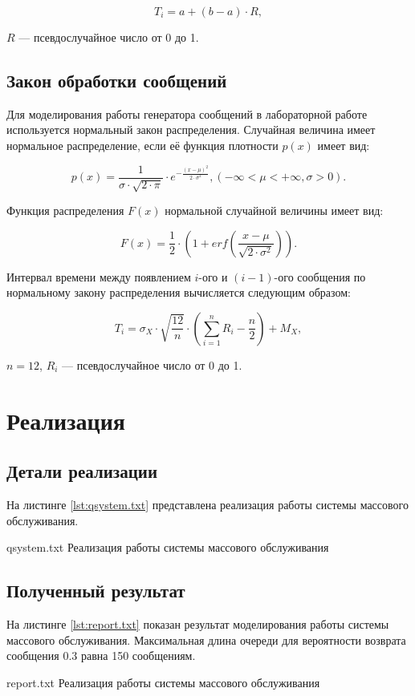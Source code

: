 \begin{equation}
	T_{i} = a + (b - a) \cdot R,
\end{equation}

 $R$ --- псевдослучайное число от 0 до 1.

\section{Закон обработки сообщений}

Для моделирования работы генератора сообщений в лабораторной работе используется нормальный закон распределения. Случайная величина имеет нормальное распределение, если её функция плотности $p(x)$ имеет вид:

\begin{equation}
    p(x) = \frac{1}{\sigma \cdot \sqrt{2 \cdot \pi}} \cdot e^{-\frac{(x - \mu)^2}{2 \cdot \sigma^2}}, (-\infty < \mu < +\infty, \sigma > 0).
\end{equation}

Функция распределения $F(x)$ нормальной случайной величины имеет вид:

\begin{equation}
    F(x) = \frac{1}{2} \cdot (1 + erf(\frac{x - \mu}{\sqrt{2 \cdot \sigma^2}})).
\end{equation}

Интервал времени между появлением $i$-ого и $(i - 1)$-ого сообщения по нормальному закону распределения вычисляется следующим образом:

\begin{equation}
	T_{i} = \sigma_{X} \cdot \sqrt{\frac{12}{n}} \cdot (\sum_{i = 1}^n R_{i} - \frac{n}{2}) + M_{X}, 
\end{equation}

 $n = 12$, $R_{i}$ --- псевдослучайное число от 0 до 1.

\chapter{Реализация}

\section{Детали реализации}

На листинге \ref{lst:qsystem.txt} представлена реализация работы системы массового обслуживания.

    {qsystem.txt}
    {Реализация работы системы массового обслуживания}
\newpage

\section{Полученный результат}

На листинге \ref{lst:report.txt} показан результат моделирования работы системы массового обслуживания. Максимальная длина очереди для вероятности возврата сообщения 0.3 равна 150 сообщениям.

    {report.txt}
    {Реализация работы системы массового обслуживания}
\newpage

